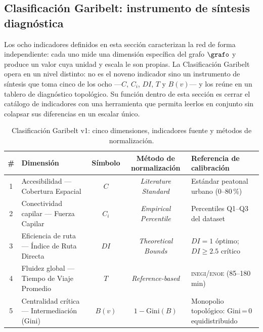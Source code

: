 

\subsection{Clasificación Garibelt: instrumento de síntesis diagnóstica}
\label{subsec:clasificacion-garibelt}

Los ocho indicadores definidos en esta sección caracterizan la red de forma
independiente: cada uno mide una dimensión específica del grafo $\grafo$ y produce
un valor cuya unidad y escala le son propias. La Clasificación Garibelt opera en
un nivel distinto: no es el noveno indicador sino un instrumento de síntesis que
toma cinco de los ocho ---$C$, $C_i$, $DI$, $T$ y $B(v)$--- y los reúne en un
tablero de diagnóstico topológico. Su función dentro de esta sección es cerrar el
catálogo de indicadores con una herramienta que permita leerlos en conjunto sin
colapsar sus diferencias en un escalar único.

\begin{table}[htbp]
\centering
\caption[Clasificación Garibelt: dimensiones e instrumentos de normalización]{%
    Clasificación Garibelt v1: cinco dimensiones, indicadores fuente y métodos
    de normalización.}
\label{tab:clasificacion-garibelt-dims}
\begin{tabularx}{\textwidth}{c >{\raggedright\arraybackslash}X c c >{\raggedright\arraybackslash}X}
    \toprule
    \textbf{\#} & \textbf{Dimensión} & \textbf{Símbolo} &
    \textbf{Método de normalización} & \textbf{Referencia de calibración} \\
    \midrule
    1 & Accesibilidad — Cobertura Espacial
      & $C$
      & \textit{Literature Standard}
      & Estándar peatonal urbano (0–80\,\%) \\
    2 & Conectividad capilar — Fuerza Capilar
      & $C_i$
      & \textit{Empirical Percentile}
      & Percentiles Q1–Q3 del dataset \\
    3 & Eficiencia de ruta — Índice de Ruta Directa
      & $DI$
      & \textit{Theoretical Bounds}
      & $DI = 1$ óptimo; $DI \geq 2.5$ crítico \\
    4 & Fluidez global — Tiempo de Viaje Promedio
      & $T$
      & \textit{Reference-based}
      & \textsc{inegi}/\textsc{enoe} \cdmx{} (85–180\,min) \\
    5 & Centralidad crítica — Intermediación (Gini)
      & $B(v)$
      & $1 - \mathrm{Gini}(B)$
      & Monopolio topológico: Gini\,=\,0 equidistribuido \\
    \bottomrule
\end{tabularx}
\smallskip

\end{table}

